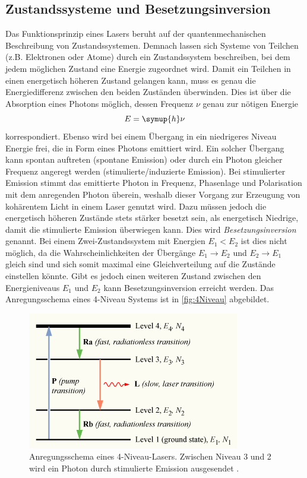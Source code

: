 \subsection{Zustandssysteme und Besetzungsinversion}
\label{subsec:Theorie_Zustandssysteme}
Das Funktionsprinzip eines Lasers beruht auf der quantenmechanischen Beschreibung von Zustandssystemen. Demnach lassen sich Systeme von Teilchen (z.B. Elektronen oder Atome)
durch ein Zustandssystem beschreiben, bei dem jedem möglichen Zustand eine Energie zugeordnet wird. Damit ein Teilchen in einen energetisch höheren Zustand gelangen kann,
muss es genau die Energiedifferenz zwischen den beiden Zuständen überwinden. Dies ist über die Absorption eines Photons möglich, dessen Frequenz $\nu$ genau zur nötigen 
Energie 
\begin{equation}
    \label{eqn:E}
    E = \symup{h}\nu
\end{equation}
korrespondiert. Ebenso wird bei einem Übergang in ein niedrigeres Niveau Energie frei, die in Form eines Photons emittiert wird. Ein solcher 
Übergang kann spontan auftreten (spontane Emission) oder durch ein Photon gleicher Frequenz angeregt werden (stimulierte/induzierte Emission). Bei stimulierter Emission
stimmt das emittierte Photon in Frequenz, Phasenlage und Polarisation mit dem anregenden Photon überein, weshalb dieser Vorgang zur Erzeugung von kohärentem Licht in einem 
Laser genutzt wird. Dazu müssen jedoch die energetisch höheren Zustände stets stärker besetzt sein, als energetisch Niedrige, damit die stimulierte Emission überwiegen kann. 
Dies wird \textit{Besetzungsinversion} genannt. Bei einem Zwei-Zustandssystem mit Energien $E_1 < E_2$ ist dies nicht möglich, da die Wahrscheinlichkeiten der Übergänge
$E_1 \to E_2$ und $E_2 \to E_1$ gleich sind und sich somit maximal eine Gleichverteilung auf die Zustände einstellen könnte. Gibt es jedoch einen weiteren Zustand zwischen
den Energieniveaus $E_1$ und $E_2$ kann Besetzungsinversion erreicht werden. Das Anregungsschema eines 4-Niveau Systems ist in \autoref{fig:4Niveau} abgebildet.
\begin{figure}
    \centering
    \includegraphics[scale=0.58]{content/pics/Population-inversion-4level.png}
    \caption{Anregungsschema eines 4-Niveau-Lasers. Zwischen Niveau 3 und 2 wird ein Photon durch stimulierte Emission ausgesendet \cite{wikipedia_population_inversion}.}
    \label{fig:4Niveau}
\end{figure}
